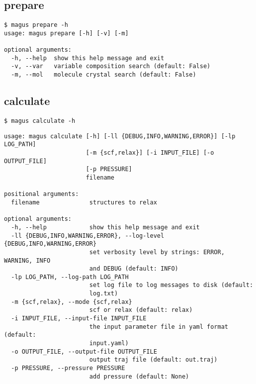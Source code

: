 \documentclass[12pt,oneside]{book}
\begin{document}
\subsection{prepare}
\begin{tcolorbox}
    \begin{verbatim}
$ magus prepare -h
usage: magus prepare [-h] [-v] [-m]

optional arguments:
  -h, --help  show this help message and exit
  -v, --var   variable composition search (default: False)
  -m, --mol   molecule crystal search (default: False)
    \end{verbatim}
\end{tcolorbox}
\subsection{calculate}
\begin{tcolorbox}
    \begin{verbatim}
$ magus calculate -h
    \end{verbatim}
    \tcblower
    \begin{verbatim}
usage: magus calculate [-h] [-ll {DEBUG,INFO,WARNING,ERROR}] [-lp LOG_PATH]
                       [-m {scf,relax}] [-i INPUT_FILE] [-o OUTPUT_FILE]
                       [-p PRESSURE]
                       filename

positional arguments:
  filename              structures to relax

optional arguments:
  -h, --help            show this help message and exit
  -ll {DEBUG,INFO,WARNING,ERROR}, --log-level {DEBUG,INFO,WARNING,ERROR}
                        set verbosity level by strings: ERROR, WARNING, INFO
                        and DEBUG (default: INFO)
  -lp LOG_PATH, --log-path LOG_PATH
                        set log file to log messages to disk (default:
                        log.txt)
  -m {scf,relax}, --mode {scf,relax}
                        scf or relax (default: relax)
  -i INPUT_FILE, --input-file INPUT_FILE
                        the input parameter file in yaml format (default:
                        input.yaml)
  -o OUTPUT_FILE, --output-file OUTPUT_FILE
                        output traj file (default: out.traj)
  -p PRESSURE, --pressure PRESSURE
                        add pressure (default: None)
    \end{verbatim}
\end{tcolorbox}
\end{document}
